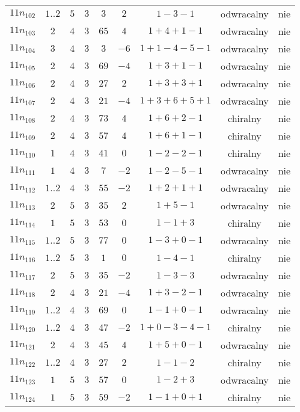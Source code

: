 \begin{longtable}{ccccccccc}
$11n_{102}$ & $1..2$ & $5$ & $3$ & $3$ & $2$ & $1-3-1$ & odwracalny & nie \\
$11n_{103}$ & $2$ & $4$ & $3$ & $65$ & $4$ & $1+4+1-1$ & odwracalny & nie \\
$11n_{104}$ & $3$ & $4$ & $3$ & $3$ & $-6$ & $1+1-4-5-1$ & odwracalny & nie \\
$11n_{105}$ & $2$ & $4$ & $3$ & $69$ & $-4$ & $1+3+1-1$ & odwracalny & nie \\
$11n_{106}$ & $2$ & $4$ & $3$ & $27$ & $2$ & $1+3+3+1$ & odwracalny & nie \\
$11n_{107}$ & $2$ & $4$ & $3$ & $21$ & $-4$ & $1+3+6+5+1$ & odwracalny & nie \\
$11n_{108}$ & $2$ & $4$ & $3$ & $73$ & $4$ & $1+6+2-1$ & chiralny & nie \\
$11n_{109}$ & $2$ & $4$ & $3$ & $57$ & $4$ & $1+6+1-1$ & chiralny & nie \\
$11n_{110}$ & $1$ & $4$ & $3$ & $41$ & $0$ & $1-2-2-1$ & chiralny & nie \\
$11n_{111}$ & $1$ & $4$ & $3$ & $7$ & $-2$ & $1-2-5-1$ & odwracalny & nie \\
$11n_{112}$ & $1..2$ & $4$ & $3$ & $55$ & $-2$ & $1+2+1+1$ & odwracalny & nie \\
$11n_{113}$ & $2$ & $5$ & $3$ & $35$ & $2$ & $1+5-1$ & odwracalny & nie \\
$11n_{114}$ & $1$ & $5$ & $3$ & $53$ & $0$ & $1-1+3$ & chiralny & nie \\
$11n_{115}$ & $1..2$ & $5$ & $3$ & $77$ & $0$ & $1-3+0-1$ & odwracalny & nie \\
$11n_{116}$ & $1..2$ & $5$ & $3$ & $1$ & $0$ & $1-4-1$ & chiralny & nie \\
$11n_{117}$ & $2$ & $5$ & $3$ & $35$ & $-2$ & $1-3-3$ & odwracalny & nie \\
$11n_{118}$ & $2$ & $4$ & $3$ & $21$ & $-4$ & $1+3-2-1$ & odwracalny & nie \\
$11n_{119}$ & $1..2$ & $4$ & $3$ & $69$ & $0$ & $1-1+0-1$ & odwracalny & nie \\
$11n_{120}$ & $1..2$ & $4$ & $3$ & $47$ & $-2$ & $1+0-3-4-1$ & chiralny & nie \\
$11n_{121}$ & $2$ & $4$ & $3$ & $45$ & $4$ & $1+5+0-1$ & odwracalny & nie \\
$11n_{122}$ & $1..2$ & $4$ & $3$ & $27$ & $2$ & $1-1-2$ & chiralny & nie \\
$11n_{123}$ & $1$ & $5$ & $3$ & $57$ & $0$ & $1-2+3$ & odwracalny & nie \\
$11n_{124}$ & $1$ & $5$ & $3$ & $59$ & $-2$ & $1-1+0+1$ & chiralny & nie \\

\end{longtable}
